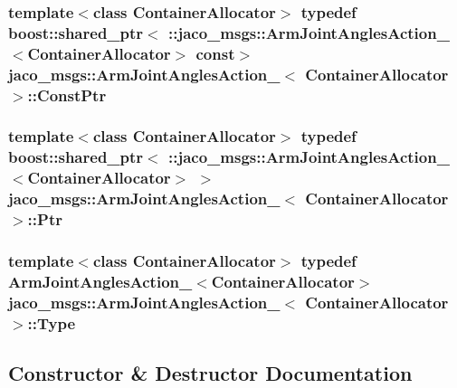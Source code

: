 \subsubsection[{\texorpdfstring{Const\+Ptr}{ConstPtr}}]{\setlength{\rightskip}{0pt plus 5cm}template$<$class Container\+Allocator$>$ typedef boost\+::shared\+\_\+ptr$<$ \+::{\bf jaco\+\_\+msgs\+::\+Arm\+Joint\+Angles\+Action\+\_\+}$<$Container\+Allocator$>$ const$>$ {\bf jaco\+\_\+msgs\+::\+Arm\+Joint\+Angles\+Action\+\_\+}$<$ Container\+Allocator $>$\+::{\bf Const\+Ptr}}\hypertarget{structjaco__msgs_1_1ArmJointAnglesAction___a887ee408ca82f8192afc1d067521d3f5}{}\label{structjaco__msgs_1_1ArmJointAnglesAction___a887ee408ca82f8192afc1d067521d3f5}
\subsubsection[{\texorpdfstring{Ptr}{Ptr}}]{\setlength{\rightskip}{0pt plus 5cm}template$<$class Container\+Allocator$>$ typedef boost\+::shared\+\_\+ptr$<$ \+::{\bf jaco\+\_\+msgs\+::\+Arm\+Joint\+Angles\+Action\+\_\+}$<$Container\+Allocator$>$ $>$ {\bf jaco\+\_\+msgs\+::\+Arm\+Joint\+Angles\+Action\+\_\+}$<$ Container\+Allocator $>$\+::{\bf Ptr}}\hypertarget{structjaco__msgs_1_1ArmJointAnglesAction___a8b28d498c1ddae863fb41f6e398ade53}{}\label{structjaco__msgs_1_1ArmJointAnglesAction___a8b28d498c1ddae863fb41f6e398ade53}
\subsubsection[{\texorpdfstring{Type}{Type}}]{\setlength{\rightskip}{0pt plus 5cm}template$<$class Container\+Allocator$>$ typedef {\bf Arm\+Joint\+Angles\+Action\+\_\+}$<$Container\+Allocator$>$ {\bf jaco\+\_\+msgs\+::\+Arm\+Joint\+Angles\+Action\+\_\+}$<$ Container\+Allocator $>$\+::{\bf Type}}\hypertarget{structjaco__msgs_1_1ArmJointAnglesAction___add1c0a2d3aef9fd47f39271e09ee6371}{}\label{structjaco__msgs_1_1ArmJointAnglesAction___add1c0a2d3aef9fd47f39271e09ee6371}


\subsection{Constructor \& Destructor Documentation}
